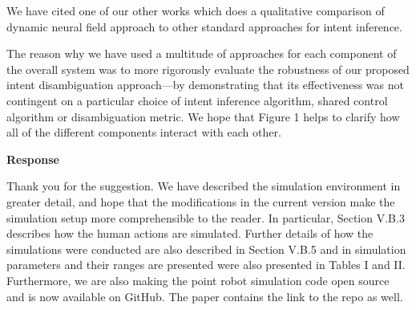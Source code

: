 \documentclass[a4paper,twoside,11pt]{reviewresponse}
\begin{document}
We have cited one of our other works which does a qualitative comparison of dynamic neural field approach to other standard approaches for intent inference.

The reason why we have used a multitude of approaches for each 
component of the overall system was to more rigorously evaluate the 
robustness of our proposed intent disambiguation approach---by 
demonstrating that its effectiveness was not contingent on a particular 
choice of intent inference algorithm, shared control algorithm or 
disambiguation metric. We hope that Figure 1 helps to clarify how all of 
the different components interact with each other.



\textbf{Response}

Thank you for the suggestion. We have described the simulation 
environment in greater detail, and hope that the modifications in the 
current version make the simulation setup more comprehensible to the 
reader. In particular, Section V.B.3 describes how the human actions are simulated. Further details of how the simulations were conducted are also described in Section V.B.5 and in simulation parameters and their ranges are presented were also presented in Tables I and II. Furthermore, we are also making the point robot simulation code open source and is now available on GitHub. The paper contains the link to the repo as well.
\end{document}
